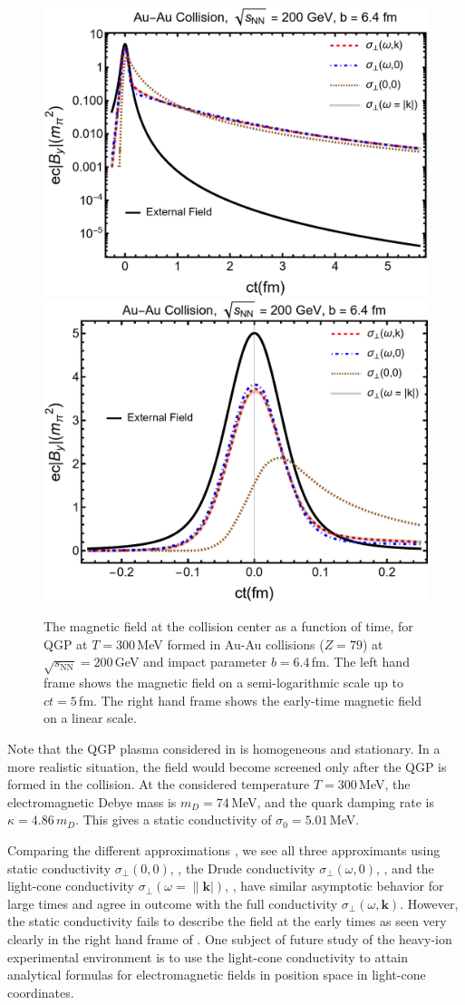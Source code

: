 \begin{figure}
\includegraphics[width=0.50\linewidth]{plots/bf100.png}
\includegraphics[width=0.47\linewidth]{plots/bf100lin.png}
\caption{The magnetic field at the collision center as a function of time, for QGP at $T = 300$\,MeV formed in Au-Au collisions ($Z=79$) at $\sqrt{s_\text{NN}} = 200$\,GeV and impact parameter $b = 6.4\,$fm. The left hand frame shows the magnetic field on a semi-logarithmic scale up to $ct = 5$\,fm. The right hand frame shows the early-time magnetic field on a linear scale. \label{fig:bfcomp}}
\end{figure}

Note that the QGP plasma considered in  is homogeneous and stationary. In a more realistic situation, the field would become screened only after the QGP is formed in the collision. At the considered temperature $T = 300$\,MeV, the electromagnetic Debye mass is $m_D = 74\,$MeV, and the quark damping rate is $\kappa = 4.86\,m_D$. This gives a static conductivity of $\sigma_0 = 5.01\,$MeV. 

Comparing the different approximations   , we see  all three approximants using static conductivity $\sigma_\bot(0,0)$, , the Drude conductivity $\sigma_\bot(\omega,0)$, ,  and the light-cone conductivity $\sigma_\bot(\omega=\|\boldsymbol{k}|)$, ,  have similar asymptotic behavior for large times and agree in outcome with the full conductivity $\sigma_\perp(\omega,\boldsymbol{k})$. However, the static conductivity fails to describe the field at the early times as seen very clearly in the right hand frame of . One subject of future study of the heavy-ion experimental environment is to use the light-cone conductivity to attain analytical formulas for electromagnetic fields in position space in light-cone coordinates.

